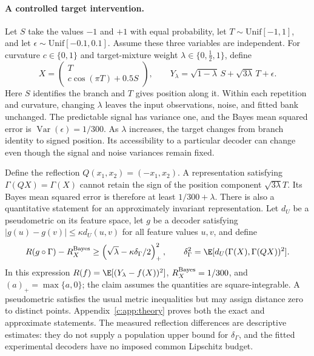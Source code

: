 \paragraph{A controlled target intervention.}\label{c:sec:controlled}
Let $S$ take the values $-1$ and $+1$ with equal probability, let
$T\sim\mathrm{Unif}[-1,1]$, and let
$\epsilon\sim\mathrm{Unif}[-0.1,0.1]$. Assume these three variables are
independent. For curvature $c\in\{0,1\}$ and target-mixture weight
$\lambda\in\{0,\tfrac12,1\}$, define
\begin{equation}\label{c:eq:branch}
 X=\begin{pmatrix}T\\c\cos(\pi T)+0.5S\end{pmatrix},\qquad
 Y_\lambda=\sqrt{1-\lambda}\,S+\sqrt{3\lambda}\,T+\epsilon.
\end{equation}
Here $S$ identifies the branch and $T$ gives position along it. Within each
repetition and curvature, changing $\lambda$ leaves the input observations,
noise, and fitted bank unchanged. The predictable signal has variance one,
and the Bayes mean squared error is $\operatorname{Var}(\epsilon)=1/300$.
As $\lambda$ increases, the target changes from branch identity to signed
position. Its accessibility to a particular decoder can change even though
the signal and noise variances remain fixed.

Define the reflection $Q(x_1,x_2)=(-x_1,x_2)$. A representation satisfying
$\Gamma(QX)=\Gamma(X)$ cannot retain the sign of the position component
$\sqrt{3\lambda}T$. Its Bayes mean squared error is therefore at least
$1/300+\lambda$. There is also a quantitative statement for an approximately
invariant representation. Let $d_U$ be a pseudometric on its feature space,
let $g$ be a decoder satisfying
$|g(u)-g(v)|\leq\kappa d_U(u,v)$ for all feature values $u,v$, and define
\begin{equation}\label{c:eq:symmetrybound}
 R(g\circ\Gamma)-R_X^{\rm Bayes}
 \geq\left(\sqrt\lambda-\kappa\delta_\Gamma/2\right)_+^2,
 \qquad
 \delta_\Gamma^2=\E[d_U(\Gamma(X),\Gamma(QX))^2].
\end{equation}
In this expression $R(f)=\E[(Y_\lambda-f(X))^2]$,
$R_X^{\rm Bayes}=1/300$, and $(a)_+=\max\{a,0\}$; the claim assumes the
quantities are square-integrable. A pseudometric satisfies the usual
metric inequalities but may assign distance zero to distinct points.
Appendix~\ref{c:app:theory} proves both the exact and approximate statements.
The measured reflection differences are descriptive estimates: they do not
supply a population upper bound for $\delta_\Gamma$, and the fitted
experimental decoders have no imposed common Lipschitz budget.

